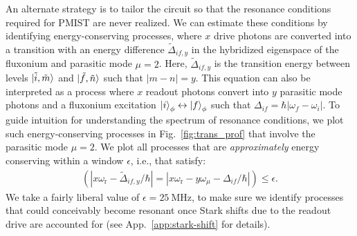 \documentclass[%
reprint,
superscriptaddress,
 amsmath,amssymb,
 aps,
 prx,
longbibliography,
floatfix,
]{revtex4-2}
\begin{document}
An alternate strategy is to tailor the circuit so that the resonance conditions required for PMIST are never realized. We can estimate these conditions by identifying energy-conserving processes, where $x$ drive photons are converted into a transition with an energy difference $\tilde{\Delta}_{if,y}$ in the hybridized eigenspace of the fluxonium and parasitic mode $\mu=2$. Here, $\tilde{\Delta}_{if,y}$ is the transition energy between levels $\ket{\tilde{i},\tilde{m}}$ and $\ket{\tilde{f},\tilde{n}}$ such that $|m-n|=y$. This equation can also be interpreted as a process where $x$ readout photons convert into $y$ parasitic mode photons and a fluxonium excitation $\ket{i}_\phi \leftrightarrow \ket{f}_\phi$ such that $\Delta_{if}=\hbar|\omega_f-\omega_i|$. To guide intuition for understanding the spectrum of resonance conditions, we plot such energy-conserving processes in Fig.~\ref{fig:trans_prof} that involve the parasitic mode $\mu=2$. We plot all processes that are {\it approximately} energy conserving within a window $\epsilon$, i.e., that satisfy:
\begin{align}
\left(
    |x\omega_\textrm{r}-\tilde{\Delta}_{if,y}/\hbar| = 
|x\omega_\textrm{r}-y\omega_\mu-\Delta_{if}/\hbar| \right) \le \epsilon.
\label{eq:En_cons}
\end{align}
We take a fairly liberal value of $\epsilon = 25 \ \textrm{MHz}$, to make sure we identify processes that could conceivably become resonant once Stark shifts due to the readout drive are accounted for (see App.~\ref{app:stark-shift} for details).
\end{document}
